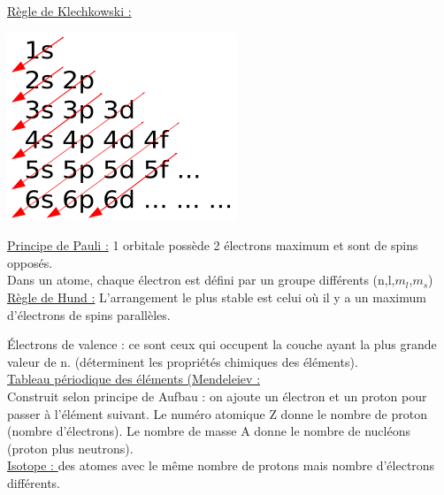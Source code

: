 \documentclass[../main.tex]{subfiles}
\begin{document}
\quad \underline{Règle de Klechkowski :}\\
\begin{minipage}{.3\textwidth}
    \includegraphics[width=\textwidth]{IMAGES/mx/260px-Klechkovski_rule.svg.png}
\end{minipage}
\hfill
\begin{minipage}{.7\textwidth}
    \underline{Principe de Pauli :} 1 orbitale possède 2 électrons maximum et sont de spins opposés.\\
    Dans un atome, chaque électron est défini par un groupe différents (n,l,$m_l$,$m_s$)\\

    \underline{Règle de Hund :} L'arrangement le plus stable est celui où il y a un maximum d'électrons de spins parallèles.
\end{minipage}

Électrons de valence : ce sont ceux qui occupent la couche ayant la plus grande valeur de n. (déterminent les propriétés chimiques des éléments).\\

\quad \underline{Tableau périodique des éléments (Mendeleiev :}\\
Construit selon principe de Aufbau : on ajoute un électron et un proton pour passer à l'élément suivant. Le numéro atomique Z donne le nombre de proton (nombre d'électrons). Le nombre de masse A donne le nombre de nucléons (proton plus neutrons).\\

\underline{Isotope : } des atomes avec le même nombre de protons mais nombre d'électrons différents.\\
\end{document}

